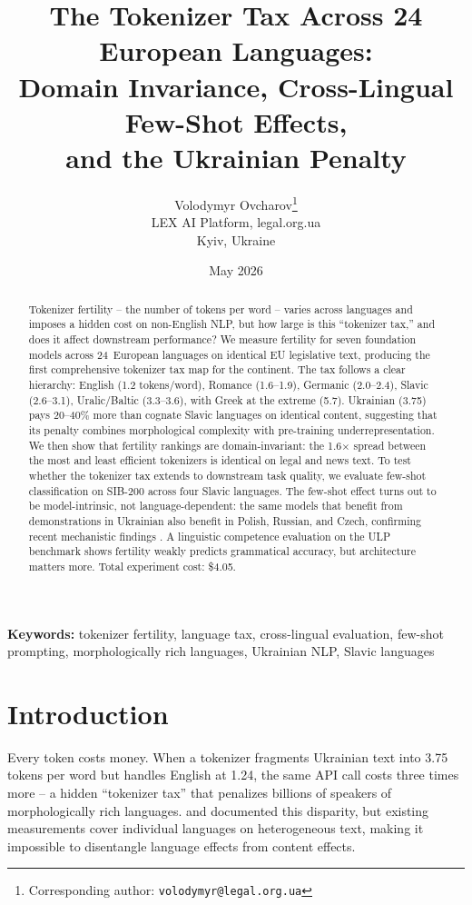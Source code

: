 \documentclass[11pt,a4paper]{article}
\title{The Tokenizer Tax Across 24 European Languages:\\
Domain Invariance, Cross-Lingual Few-Shot Effects,\\
and the Ukrainian Penalty}
\author{
  Volodymyr Ovcharov\thanks{Corresponding author: \texttt{volodymyr@legal.org.ua}} \\
  LEX AI Platform, legal.org.ua \\
  Kyiv, Ukraine
}
\date{May 2026}
\begin{document}
\maketitle

\begin{abstract}
Tokenizer fertility -- the number of tokens per word -- varies across languages and imposes a hidden cost on non-English NLP, but how large is this ``tokenizer tax,'' and does it affect downstream performance? We measure fertility for seven foundation models across 24~European languages on identical EU legislative text, producing the first comprehensive tokenizer tax map for the continent. The tax follows a clear hierarchy: English (1.2 tokens/word), Romance (1.6--1.9), Germanic (2.0--2.4), Slavic (2.6--3.1), Uralic/Baltic (3.3--3.6), with Greek at the extreme (5.7). Ukrainian (3.75) pays 20--40\% more than cognate Slavic languages on identical content, suggesting that its penalty combines morphological complexity with pre-training underrepresentation. We then show that fertility rankings are domain-invariant: the 1.6$\times$ spread between the most and least efficient tokenizers is identical on legal and news text. To test whether the tokenizer tax extends to downstream task quality, we evaluate few-shot classification on SIB-200 across four Slavic languages. The few-shot effect turns out to be model-intrinsic, not language-dependent: the same models that benefit from demonstrations in Ukrainian also benefit in Polish, Russian, and Czech, confirming recent mechanistic findings \citep{ovcharov2026fewshot}. A linguistic competence evaluation on the ULP benchmark shows fertility weakly predicts grammatical accuracy, but architecture matters more. Total experiment cost: \$4.05.
\end{abstract}

\noindent\textbf{Keywords:} tokenizer fertility, language tax, cross-lingual evaluation, few-shot prompting, morphologically rich languages, Ukrainian NLP, Slavic languages

\section{Introduction}

Every token costs money. When a tokenizer fragments Ukrainian text into 3.75 tokens per word but handles English at 1.24, the same API call costs three times more -- a hidden ``tokenizer tax'' that penalizes billions of speakers of morphologically rich languages. \citet{petrov2024language} and \citet{ahia2023all} documented this disparity, but existing measurements cover individual languages on heterogeneous text, making it impossible to disentangle language effects from content effects.
\end{document}
